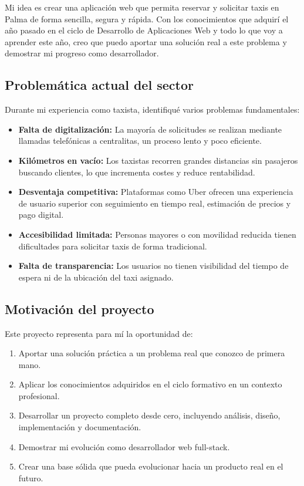 \documentclass[12pt,a4paper]{article}
\begin{document}
Mi idea es crear una aplicación web que permita reservar y solicitar taxis en Palma de forma sencilla, segura y rápida. Con los conocimientos que adquirí el año pasado en el ciclo de Desarrollo de Aplicaciones Web y todo lo que voy a aprender este año, creo que puedo aportar una solución real a este problema y demostrar mi progreso como desarrollador.

\subsection{Problemática actual del sector}

Durante mi experiencia como taxista, identifiqué varios problemas fundamentales:

\begin{itemize}
    \item \textbf{Falta de digitalización:} La mayoría de solicitudes se realizan mediante llamadas telefónicas a centralitas, un proceso lento y poco eficiente.
    \item \textbf{Kilómetros en vacío:} Los taxistas recorren grandes distancias sin pasajeros buscando clientes, lo que incrementa costes y reduce rentabilidad.
    \item \textbf{Desventaja competitiva:} Plataformas como Uber ofrecen una experiencia de usuario superior con seguimiento en tiempo real, estimación de precios y pago digital.
    \item \textbf{Accesibilidad limitada:} Personas mayores o con movilidad reducida tienen dificultades para solicitar taxis de forma tradicional.
    \item \textbf{Falta de transparencia:} Los usuarios no tienen visibilidad del tiempo de espera ni de la ubicación del taxi asignado.
\end{itemize}

\subsection{Motivación del proyecto}

Este proyecto representa para mí la oportunidad de:

\begin{enumerate}
    \item Aportar una solución práctica a un problema real que conozco de primera mano.
    \item Aplicar los conocimientos adquiridos en el ciclo formativo en un contexto profesional.
    \item Desarrollar un proyecto completo desde cero, incluyendo análisis, diseño, implementación y documentación.
    \item Demostrar mi evolución como desarrollador web full-stack.
    \item Crear una base sólida que pueda evolucionar hacia un producto real en el futuro.
\end{enumerate}
\end{document}
